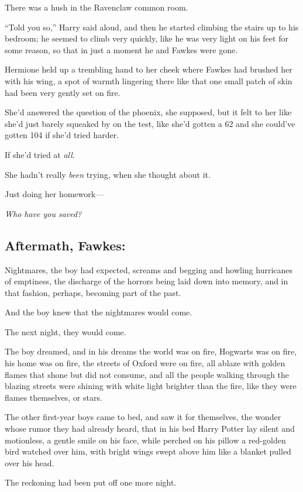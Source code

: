 There was a hush in the Ravenclaw common room.

“Told you so,” Harry said aloud, and then he started climbing the stairs up to his bedroom; he seemed to climb very quickly, like he was very light on his feet for some reason, so that in just a moment he and Fawkes were gone.

Hermione held up a trembling hand to her cheek where Fawkes had brushed her with his wing, a spot of warmth lingering there like that one small patch of skin had been very gently set on fire.

She’d answered the question of the phoenix, she supposed, but it felt to her like she’d just barely squeaked by on the test, like she’d gotten a 62 and she could’ve gotten 104 if she’d tried harder.

If she’d tried at \emph{all}.

She hadn’t really \emph{been} trying, when she thought about it.

Just doing her homework—

\emph{Who have you saved?}
\replacement{\sbreak}{}

\subsection{Aftermath, Fawkes:}

\noindent{}Nightmares, the boy had expected, screams and begging and howling hurricanes of emptiness, the discharge of the horrors being laid down into memory, and in that fashion, perhaps, becoming part of the past.

And the boy knew that the nightmares would come.

The next night, they would come.

The boy dreamed, and in his dreams the world was on fire, Hogwarts was on fire, his home was on fire, the streets of Oxford were on fire, all ablaze with golden flames that shone but did not consume, and all the people walking through the blazing streets were shining with white light brighter than the fire, like they were flames themselves, or stars.

The other first-year boys came to bed, and saw it for themselves, the wonder whose rumor they had already heard, that in his bed Harry Potter lay silent and motionless, a gentle smile on his face, while perched on his pillow a red-golden bird watched over him, with bright wings swept above him like a blanket pulled over his head.

The reckoning had been put off one more night.
\replacement{\sbreak}{}

